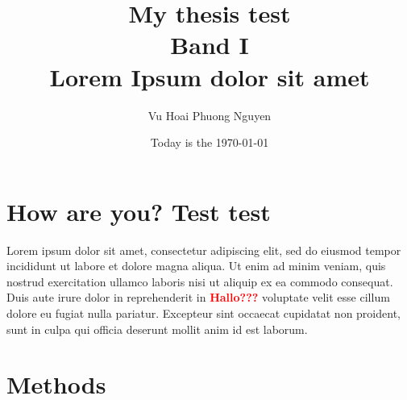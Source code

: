 \documentclass[a4paper,12pt]{article}
\begin{document}
\title{\Huge My thesis test\\
Band I\\
Lorem Ipsum dolor sit amet}
\author{Vu Hoai Phuong Nguyen}
\date{Today is the \today}
\maketitle
\pagebreak
{}
\tableofcontents
\newpage
{}
\listoffigures
\pagebreak
\section{How are you? Test test}
Lorem ipsum dolor sit amet, consectetur adipiscing elit, sed do eiusmod tempor incididunt ut labore et dolore magna aliqua. Ut enim ad minim veniam,%
quis nostrud exercitation ullamco laboris nisi ut aliquip ex ea commodo consequat. Duis aute irure dolor in reprehenderit in \textbf{\textcolor{red}{Hallo???}} voluptate velit esse cillum dolore eu fugiat nulla pariatur. Excepteur sint occaecat cupidatat non proident, sunt in culpa qui officia deserunt mollit anim id est laborum.
\section{Methods}
\end{document}
